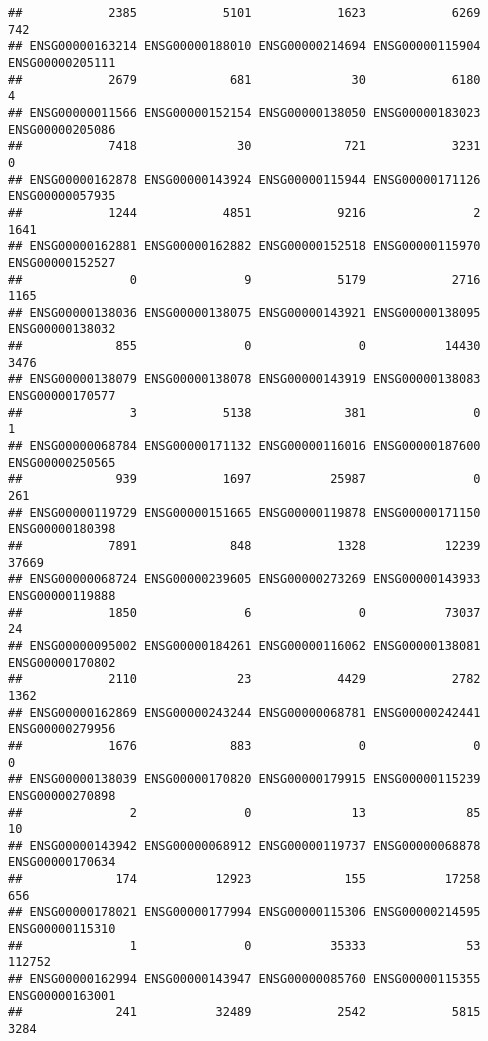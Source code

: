 \documentclass[
]{article}
\begin{document}
\begin{verbatim}
##            2385            5101            1623            6269             742 
## ENSG00000163214 ENSG00000188010 ENSG00000214694 ENSG00000115904 ENSG00000205111 
##            2679             681              30            6180               4 
## ENSG00000011566 ENSG00000152154 ENSG00000138050 ENSG00000183023 ENSG00000205086 
##            7418              30             721            3231               0 
## ENSG00000162878 ENSG00000143924 ENSG00000115944 ENSG00000171126 ENSG00000057935 
##            1244            4851            9216               2            1641 
## ENSG00000162881 ENSG00000162882 ENSG00000152518 ENSG00000115970 ENSG00000152527 
##               0               9            5179            2716            1165 
## ENSG00000138036 ENSG00000138075 ENSG00000143921 ENSG00000138095 ENSG00000138032 
##             855               0               0           14430            3476 
## ENSG00000138079 ENSG00000138078 ENSG00000143919 ENSG00000138083 ENSG00000170577 
##               3            5138             381               0               1 
## ENSG00000068784 ENSG00000171132 ENSG00000116016 ENSG00000187600 ENSG00000250565 
##             939            1697           25987               0             261 
## ENSG00000119729 ENSG00000151665 ENSG00000119878 ENSG00000171150 ENSG00000180398 
##            7891             848            1328           12239           37669 
## ENSG00000068724 ENSG00000239605 ENSG00000273269 ENSG00000143933 ENSG00000119888 
##            1850               6               0           73037              24 
## ENSG00000095002 ENSG00000184261 ENSG00000116062 ENSG00000138081 ENSG00000170802 
##            2110              23            4429            2782            1362 
## ENSG00000162869 ENSG00000243244 ENSG00000068781 ENSG00000242441 ENSG00000279956 
##            1676             883               0               0               0 
## ENSG00000138039 ENSG00000170820 ENSG00000179915 ENSG00000115239 ENSG00000270898 
##               2               0              13              85              10 
## ENSG00000143942 ENSG00000068912 ENSG00000119737 ENSG00000068878 ENSG00000170634 
##             174           12923             155           17258             656 
## ENSG00000178021 ENSG00000177994 ENSG00000115306 ENSG00000214595 ENSG00000115310 
##               1               0           35333              53          112752 
## ENSG00000162994 ENSG00000143947 ENSG00000085760 ENSG00000115355 ENSG00000163001 
##             241           32489            2542            5815            3284 

\end{verbatim}
\end{document}
